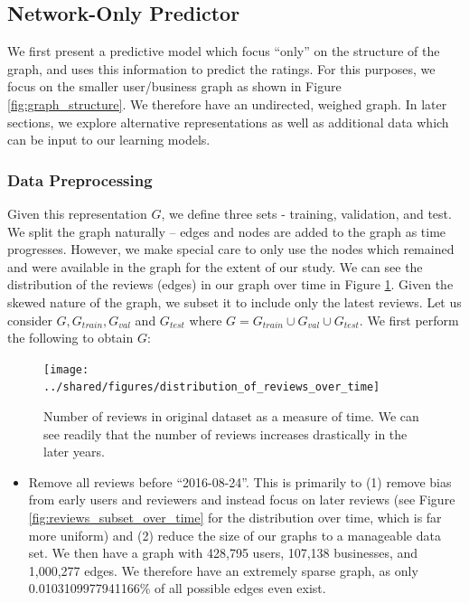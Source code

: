 \documentclass[letterpaper, 10 pt, conference]{ieeeconf}  %
\begin{document}
\subsection{Network-Only Predictor}
We first present a predictive model which focus ``only'' on the structure of the graph, and uses this information to predict the ratings. For this purposes, we focus on the smaller user/business graph as shown in Figure \ref{fig:graph_structure}. We therefore have an undirected, weighed graph. In later sections, we explore alternative representations as well as additional data which can be input to our learning models.


\subsubsection{Data Preprocessing}
Given this representation $G$, we define three sets - training, validation, and test. We split the graph naturally -- edges and nodes are added to the graph as time progresses. However, we make special care to only use the nodes which remained and were available in the graph for the extent of our study. We can see the distribution of the reviews (edges) in our graph over time in Figure \ref{fig:reviews_over_time}. Given the skewed nature of the graph, we subset it to include only the latest reviews. Let us consider $G, G_{train}, G_{val}$ and $G_{test}$ where $G = G_{train} \cup G_{val} \cup G_{test}$. We first perform the following to obtain $G$:

\begin{figure}[h!]
\centering
\texttt{[image: ../shared/figures/distribution\_of\_reviews\_over\_time]}
\caption{Number of reviews in original dataset as a measure of time. We can see readily that the number of reviews increases drastically in the later years.}
\label{fig:reviews_over_time}
\end{figure}

\begin{itemize}
\item Remove all reviews before ``2016-08-24''. This is primarily to (1) remove bias from early users and reviewers and instead focus on later reviews (see Figure \ref{fig:reviews_subset_over_time} for the distribution over time, which is far more uniform) and (2) reduce the size of our graphs to a manageable data set. We then have a graph with 428,795 users, 107,138 businesses, and 1,000,277 edges. We therefore have an extremely sparse graph, as only 0.0103109977941166\% of all possible edges even exist.
\end{itemize}
\end{document}
